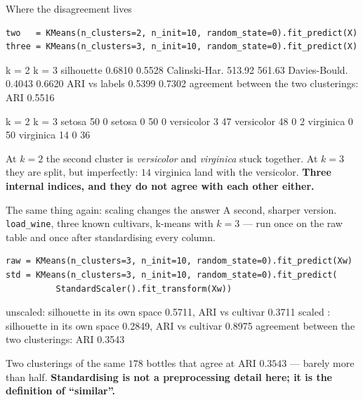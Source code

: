 \documentclass[aspectratio=169]{beamer}
\begin{document}
\begin{frame}[fragile,shrink=10]{Where the disagreement lives}
\begin{lstlisting}
two   = KMeans(n_clusters=2, n_init=10, random_state=0).fit_predict(X)
three = KMeans(n_clusters=3, n_init=10, random_state=0).fit_predict(X)
\end{lstlisting}
\begin{outblk}
                    k = 2      k = 3
silhouette         0.6810     0.5528
Calinski-Har.      513.92     561.63
Davies-Bould.      0.4043     0.6620
ARI vs labels      0.5399     0.7302
agreement between the two clusterings: ARI 0.5516
\end{outblk}
\begin{outblk}
k = 2                         k = 3
   setosa         50    0        setosa          0   50    0
   versicolor      3   47        versicolor     48    0    2
   virginica       0   50        virginica      14    0   36
\end{outblk}
  \begin{center}\small
    At $k = 2$ the second cluster is \emph{versicolor} and \emph{virginica}
    stuck together. At $k = 3$ they are split, but imperfectly: $14$
    virginica land with the versicolor. \textbf{Three internal indices, and
    they do not agree with each other either.}
  \end{center}
\end{frame}

\begin{frame}[fragile,shrink=9]{The same thing again: scaling changes the answer}
  A second, sharper version. \texttt{load\_wine}, three known cultivars,
  k-means with $k = 3$ --- run once on the raw table and once after
  standardising every column.
\begin{lstlisting}
raw = KMeans(n_clusters=3, n_init=10, random_state=0).fit_predict(Xw)
std = KMeans(n_clusters=3, n_init=10, random_state=0).fit_predict(
          StandardScaler().fit_transform(Xw))
\end{lstlisting}
\begin{outblk}
unscaled: silhouette in its own space 0.5711, ARI vs cultivar 0.3711
scaled  : silhouette in its own space 0.2849, ARI vs cultivar 0.8975
agreement between the two clusterings: ARI 0.3543
\end{outblk}
  \begin{center}\small
    Two clusterings of the same $178$ bottles that agree at ARI
    $\mathbf{0.3543}$ --- barely more than half. \textbf{Standardising is not
    a preprocessing detail here; it is the definition of ``similar''.}
  \end{center}
\end{frame}
\end{document}
